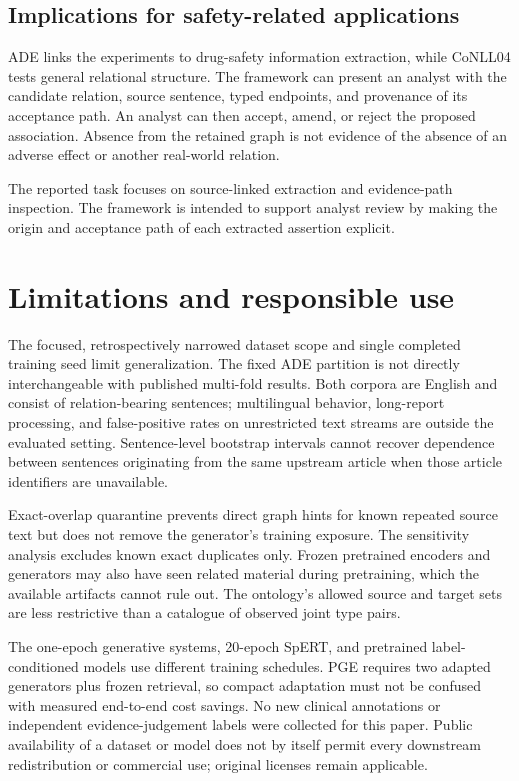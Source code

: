 \documentclass[preprint,12pt]{elsarticle}
\begin{document}
\subsection{Implications for safety-related applications}
ADE links the experiments to drug-safety information extraction, while CoNLL04
tests general relational structure. The framework can present an analyst with
the candidate relation, source sentence, typed endpoints, and provenance of
its acceptance path. An analyst can then accept, amend, or reject the proposed
association. Absence from the retained graph is not evidence of the absence
of an adverse effect or another real-world relation.

The reported task focuses on source-linked extraction and evidence-path
inspection. The framework is intended to support analyst review by making the
origin and acceptance path of each extracted assertion explicit.

\section{Limitations and responsible use}
\label{sec:limitations}
The focused, retrospectively narrowed dataset scope and single completed
training seed limit generalization. The fixed ADE partition is not directly
interchangeable with published multi-fold results. Both corpora are English
and consist of relation-bearing sentences; multilingual behavior, long-report
processing, and false-positive rates on unrestricted text streams are outside
the evaluated setting. Sentence-level bootstrap intervals cannot recover
dependence between sentences originating from the same upstream article when
those article identifiers are unavailable.

Exact-overlap quarantine prevents direct graph hints for known repeated source
text but does not remove the generator's training exposure. The sensitivity
analysis excludes known exact duplicates only. Frozen pretrained encoders and
generators may also have seen related material during pretraining, which the
available artifacts cannot rule out. The ontology's allowed source and target
sets are less restrictive than a catalogue of observed joint type pairs.

The one-epoch generative systems, 20-epoch SpERT, and pretrained label-conditioned
models use different training schedules. PGE requires two adapted
generators plus frozen retrieval, so compact adaptation must not be confused
with measured end-to-end cost savings. No new clinical annotations or
independent evidence-judgement labels were collected for this paper. Public
availability of a dataset or model does not by itself permit every downstream
redistribution or commercial use; original licenses remain applicable.
\end{document}
